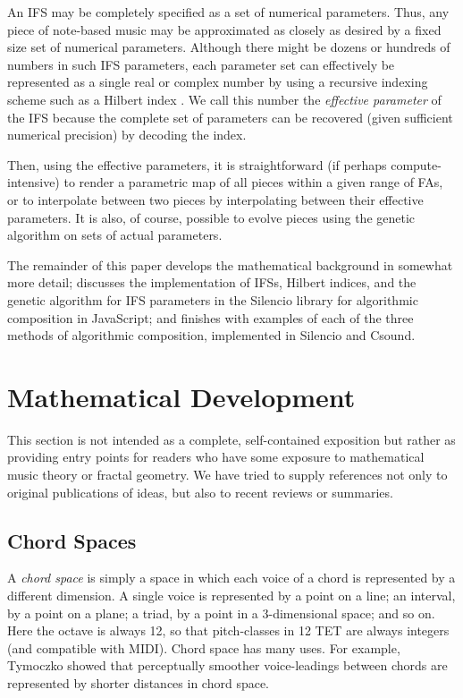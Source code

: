 \documentclass[english,11pt,letterpaper,onecolumn]{scrartcl}
\numberwithin{equation}{section}
\begin{document}
An IFS may be completely specified as a set of numerical parameters. Thus, any
piece of note-based music may be approximated as closely as desired by a fixed
size set of numerical parameters. Although there might be dozens or hundreds of
numbers in such IFS parameters, each parameter set can effectively be
represented as a single real or complex number by using a recursive indexing
scheme such as a Hilbert index \cite{hamilton2006compact}. We call this number
the \textit{effective parameter} of the IFS because the complete set of
parameters can be recovered (given sufficient numerical precision) by decoding
the index.

Then, using the effective parameters, it is straightforward (if perhaps
compute-intensive) to render a parametric map of all pieces within a given range
of FAs, or to interpolate between two pieces by interpolating between their
effective parameters. It is also, of course, possible to evolve pieces using the
genetic algorithm on sets of actual parameters.

The remainder of this paper develops the mathematical background in somewhat
more detail; discusses the implementation of IFSs, Hilbert indices, and the
genetic algorithm for IFS parameters in the Silencio library for algorithmic
composition in JavaScript; and finishes with examples of each of the three
methods of algorithmic composition, implemented in Silencio and Csound.

\section{Mathematical Development}

This section is not intended as a complete, self-contained exposition but rather
as providing entry points for readers who have some exposure to mathematical
music theory or fractal geometry. We have tried to supply references not only to
original publications of ideas, but also to recent reviews or summaries.

\subsection{Chord Spaces}

A \textit{chord space} is simply a space in which each voice of a chord is
represented by a different dimension. A single voice is represented by a point
on a line; an interval, by a point on a plane; a triad, by a point in a
3-dimensional space; and so on. Here the octave is always 12, so that
pitch-classes in 12 TET are always integers (and compatible with MIDI). Chord
space has many uses. For example, Tymoczko \cite{tymoczko2006geometry,
tymoczko2011geometry} showed that perceptually smoother voice-leadings between
chords are represented by shorter distances in chord space.
\end{document}

